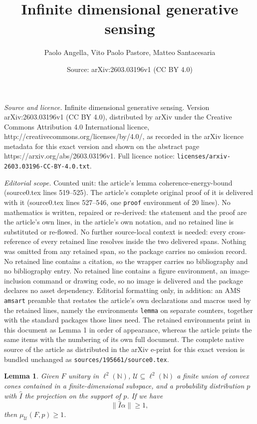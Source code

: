 \documentclass[10pt,a4paper]{amsart}
\title{Infinite dimensional generative sensing}
\author{Paolo Angella, Vito Paolo Pastore, Matteo Santacesaria}
\date{Source: arXiv:2603.03196v1 (CC BY 4.0)}
\newtheorem{lemma}{Lemma}
\newcommand{\lnn}{\ell^2(\mathbb{N})}
\begin{document}
\maketitle

\noindent\emph{Source and licence.} Infinite dimensional generative sensing. Version arXiv:2603.03196v1 (CC BY 4.0), distributed by arXiv under the Creative Commons Attribution 4.0 International licence, http://creativecommons.org/licenses/by/4.0/, as recorded in the arXiv licence metadata for this exact version and shown on the abstract page https://arxiv.org/abs/2603.03196v1. Full licence notice: \texttt{licenses/arxiv-2603.03196-CC-BY-4.0.txt}.\par\smallskip

\noindent\textit{Editorial scope.} Counted unit: the article's lemma coherence-energy-bound (source0.tex lines 519--525). The article's complete original proof of it is delivered with it (source0.tex lines 527--546, one \texttt{proof} environment of 20 lines). No mathematics is written, repaired or re-derived: the statement and the proof are the article's own lines, in the article's own notation, and no retained line is substituted or re-flowed.  No further source-local context is needed: every cross-reference of every retained line resolves inside the two delivered spans.  Nothing was omitted from any retained span, so the package carries no omission record.  No retained line contains a citation, so the wrapper carries no bibliography and no bibliography entry.  No retained line contains a figure environment, an image-inclusion command or drawing code, so no image is delivered and the package declares no asset dependency.  Editorial formatting only, in addition: an AMS \texttt{amsart} preamble that restates the article's own declarations and macros used by the retained lines, namely the environments \texttt{lemma} on separate counters, together with the standard packages those lines need.  The retained environments print in this document as Lemma 1 in order of appearance, whereas the article prints the same items with the numbering of its own full document.  The complete native source of the article as distributed in the arXiv e-print for this exact version is bundled unchanged as \texttt{sources/195661/source0.tex}.
\begin{lemma}\label{coherence-energy-bound}
    Given $F$ unitary in $\lnn$, $\mathcal{U}\subseteq\lnn$ a finite union of convex cones contained in a finite-dimensional subspace, and a probability distribution $p$ with $\hat{I}$ the projection on the support of $p$. If we have 
    \begin{equation}\label{magg-1}
        \| \hat{I} \alpha \| \geq 1,
    \end{equation}
    then $\mu_{\mathcal{U}}(F,p) \geq 1$.
\end{lemma}
\end{document}
